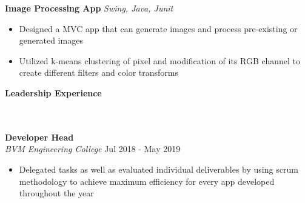 \documentclass[]{article}
\newcommand{\lineunder} {
    \vspace*{-8pt} \\
    \hrulefill \\
}
\newcommand{\header} [1] {
    {\vspace*{6pt} \fontsize{12}{12}\selectfont \textbf{#1}}
     \lineunder
}
\begin{document}
\vspace{-2mm}
{\hspace{2mm}\textbf{Image Processing App}} {\sl Swing, Java, Junit} \\
\vspace{-3mm}
\begin{itemize}
        \setlength\itemsep{-1mm}
        \item Designed a MVC app that can generate images and process pre-existing or generated images  
        \item Utilized k-means clustering of pixel and modification of its RGB channel to create different filters and color transforms 
\end{itemize}


\vspace{-3mm}
\header{Leadership Experience}
\hspace{1mm}
\textbf{Developer Head}\\ 
\hspace{1mm}
\textit{BVM Engineering College} \hfill Jul 2018 - May 2019\\
\vspace{-3mm}
\begin{itemize}
	\setlength\itemsep{-1mm}
		\item Delegated tasks as well as evaluated individual deliverables by using scrum methodology to achieve maximum efficiency for every app developed throughout the year
\end{itemize}

\ 
\end{document}

